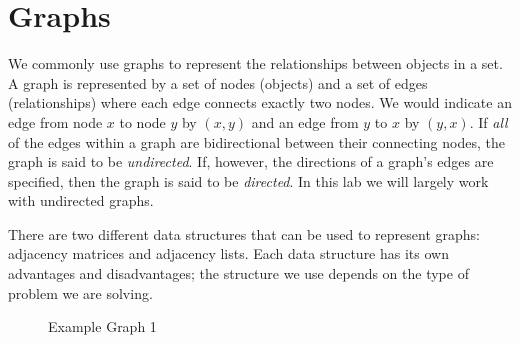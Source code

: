 \label{lab:SixDegreesKevinBacon}


\section*{Graphs}
\label{Graphs_section}
We commonly use graphs to represent the relationships between objects in a set. A graph is
represented by a set of nodes (objects) and a set of edges (relationships) where each edge
connects exactly two nodes. We would indicate an edge from node $x$ to node $y$ by $(x, y)$
and an edge from $y$ to $x$ by $(y, x)$. If \emph{all} of the edges within a graph are bidirectional
between their connecting nodes, the graph is said to be \emph{undirected}. If, however, the directions
of a graph's edges are specified, then the graph is said to be \emph{directed}. In this lab we will largely work
with undirected graphs.

There are two different data structures that can be used to represent graphs: adjacency matrices and adjacency lists.
Each data structure has its own advantages and disadvantages; the structure we use depends on the type of problem we are solving.

\begin{figure}
\centering
{}
\caption{Example Graph 1}
\label{Adjacency}
\end{figure}


